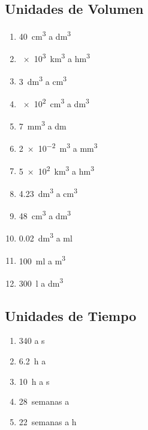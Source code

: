 \subsection{Unidades de Volumen}

\begin{exercise}
    \phantom{a}
    \begin{enumerate}[label=\letraminuscula]
        \item \qty{40}{\cubic\centi\m} a \unit{\cubic\deci\m}
        \item \qty{e3}{\cubic\kilo\m} a \unit{\cubic\hecto\m}
        \item \qty{3}{\cubic\deca\m} a \unit{\cubic\centi\m}
        \item \qty{e2}{\cubic\centi\m} a \unit{\cubic\deci\m}
        \item \qty{7}{\cubic\milli\m} a \unit{\deca\m}
        \item \qty{2e-2}{\cubic\m} a \unit{\cubic\milli\m}
        \item \qty{5e2}{\cubic\kilo\m} a \unit{\cubic\hecto\m}
        \item \qty{4.23}{\cubic\deca\m} a \unit{\cubic\centi\m}
        \item \qty{48}{\cubic\centi\m} a \unit{\cubic\deci\m}
        \item \qty{0.02}{\cubic\deca\m} a \unit{\milli\litre}
        \item \qty{100}{\milli\litre} a \unit{\cubic\metre}
        \item \qty{300}{\litre} a \unit{\cubic\deca\metre}
    \end{enumerate}
\end{exercise}

\subsection{Unidades de Tiempo}
\phantom{a}
\begin{exercise}
    \begin{enumerate}[label=\letraminuscula]
        \item \qty{340}{\min} a \unit{\s}
        \item \qty{6.2}{\hour} a \unit{\min}
        \item \qty{10}{\hour} a \unit{\s}
        \item \qty{28}{semanas} a \unit{\min}
        \item \qty{22}{semanas} a \unit{\hour}
    \end{enumerate}
\end{exercise}

